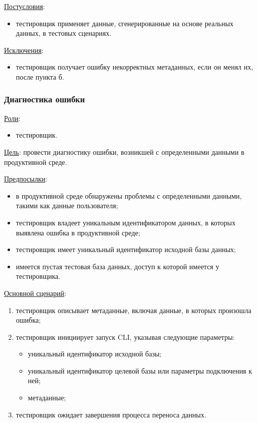 \underline{Постусловия}:

\begin{itemize}
    \item тестировщик применяет данные, сгенерированные на основе реальных данных, в тестовых сценариях.
\end{itemize}

\underline{Исключения}:

\begin{itemize}
    \item тестировщик получает ошибку некорректных метаданных, если он менял их, после пункта б.
\end{itemize}


\subsubsection{Диагностика ошибки}

\underline{Роли}:

\begin{itemize}
    \item тестировщик.
\end{itemize}

\underline{Цель}: провести диагностику ошибки, возникшей с определенными данными в продуктивной среде.

\underline{Предпосылки}:

\begin{itemize}
    \item в продуктивной среде обнаружены проблемы с определенными данными, такими как данные пользователя;
    \item тестировщик владеет уникальным идентификатором данных, в которых выявлена ошибка в продуктивной среде;
    \item тестировщик имеет уникальный идентификатор исходной базы данных;
    \item имеется пустая тестовая база данных, доступ к которой имеется у тестировщика.
\end{itemize}

\underline{Основной сценарий}:

\begin{enumerate}
    \item тестировщик описывает метаданные, включая данные, в которых произошла ошибка;
    \item тестировщик инициирует запуск CLI, указывая следующие параметры:
    \begin{itemize}
        \item уникальный идентификатор исходной базы;
        \item уникальный идентификатор целевой базы или параметры подключения к ней;
        \item метаданные;
    \end{itemize}
    \item тестировщик ожидает завершения процесса переноса данных.
\end{enumerate}


